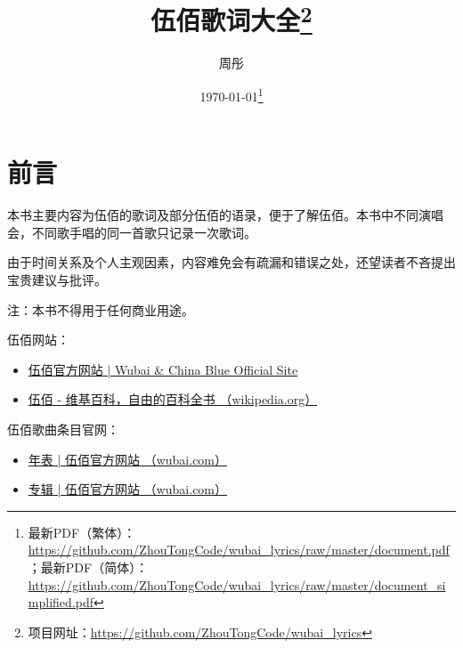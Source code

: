 \documentclass[UTF8,a4paper,oneside,twocolumn,12pt]{ctexbook}
\title{伍佰歌词大全\thanks{项目网址：\url{https://github.com/ZhouTongCode/wubai_lyrics}}}
\author{周彤}
\date{\today\thanks{\noindent 最新PDF（繁体）：\url{https://github.com/ZhouTongCode/wubai_lyrics/raw/master/document.pdf}；最新PDF（简体）：\url{https://github.com/ZhouTongCode/wubai_lyrics/raw/master/document_simplified.pdf}}}%
\begin{document}
\frontmatter
\maketitle

\onecolumn

\chapter*{前言}
本书主要内容为伍佰的歌词及部分伍佰的语录，便于了解伍佰。本书中不同演唱会，不同歌手唱的同一首歌只记录一次歌词。

由于时间关系及个人主观因素，内容难免会有疏漏和错误之处，还望读者不吝提出宝贵建议与批评。

注：本书不得用于任何商业用途。

伍佰网站：
\begin{itemize}
	\item \href{http://wubai.com/}{伍佰官方网站 | Wubai \& China Blue Official Site}
	\item \href{https://zh.wikipedia.org/zh-tw/%E4%BC%8D%E4%BD%B0}{伍佰 - 维基百科，自由的百科全书 （wikipedia.org）}
\end{itemize}

伍佰歌曲条目官网：
\begin{itemize}
	\item \href{http://wubai.com/biography/%e5%b9%b4%e8%a1%a8/}{年表 | 伍佰官方网站 （wubai.com）}
	\item \href{http://wubai.com/discography/%E5%B0%88%E8%BC%AF/}{专辑 | 伍佰官方网站 （wubai.com）}
\end{itemize}
\end{document}
